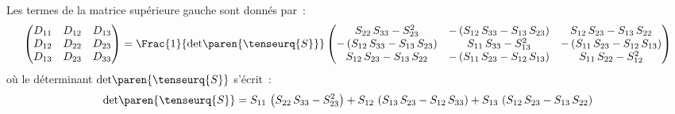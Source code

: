 \documentclass[rectoverso,pleiades,pstricks,leqno,anti]{texmf/note_technique_2010}
\begin{document}
Les termes de la matrice supérieure gauche sont donnés par~:
\[
\begin{pmatrix}
  D_{11} & D_{12} & D_{13} \\
  D_{12} & D_{22} & D_{23} \\
  D_{13} & D_{23} & D_{33} \\
\end{pmatrix} = 
\Frac{1}{\text{det}\paren{\tenseurq{S}}}
\begin{pmatrix}
  S_{22}\,S_{33}-S_{23}^2&-\left(S_{12}\,S_{33}-S_{13}\,S_{23}\right)& S_{12}\,S_{23}-S_{13}\,S_{22}\\
  -\left(S_{12}\,S_{33}-S_{13}\,S_{23}\right)&S_{11}\,S_{33}-S_{13}^2&-\left(S_{11}\,S_{23}-S_{12}\,S_{13}\right)\\
  S_{12}\,S_{23}-S_{13}\,S_{22}&-\left(S_{11}\,S_{23}-S_{12}\,S_{13}\right)&S_{11}\,S_{22}-S_{12}^2\\ 
\end{pmatrix}
\]
où le déterminant \(\text{det}\paren{\tenseurq{S}}\) s'écrit~:
\[
\text{det}\paren{\tenseurq{S}} = 
S_{11}\,\left(S_{22}\,S_{33}-S_{23}^2\right)+
S_{12}\,\left(S_{13}\,S_{23}-S_{12}\,S_{33}\right)+
S_{13}\,\left(S_{12}\,S_{23}-S_{13}\,S_{22}\right)
\]


\end{document}
